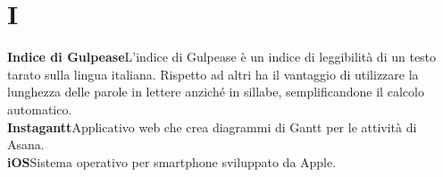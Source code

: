 \newpage
\section{I}\label{l:I}
\textbf{Indice di Gulpease}\newline L'indice di Gulpease è un indice di leggibilità di un testo tarato sulla lingua italiana. Rispetto ad altri ha il vantaggio di utilizzare la lunghezza delle parole in lettere anziché in sillabe, semplificandone il calcolo automatico.\\
\newline
\textbf{Instagantt}\newline Applicativo web che crea diagrammi di Gantt per le attività di Asana.\\
\newline
\textbf{iOS}\newline Sistema operativo per smartphone sviluppato da Apple.